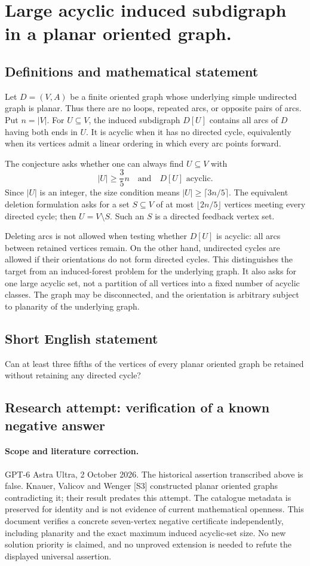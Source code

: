 \documentclass[11pt,a4paper]{article}
\begin{document}
\section*{Large acyclic induced subdigraph in a planar oriented graph.}\label{statement}

\subsection{Definitions and mathematical statement}
Let $D=(V,A)$ be a finite oriented graph whose underlying simple
undirected graph is planar. Thus there are no loops, repeated arcs,
or opposite pairs of arcs. Put $n=|V|$. For $U\subseteq V$, the induced
subdigraph $D[U]$ contains all arcs of $D$ having both ends in $U$.
It is acyclic when it has no directed cycle, equivalently when its
vertices admit a linear ordering in which every arc points forward.

The conjecture asks whether one can always find $U\subseteq V$ with
\[
                           |U|\ge\frac35n
                  \quad\text{and}\quad D[U]\text{ acyclic}.
\]
Since $|U|$ is an integer, the size condition means
$|U|\ge\lceil3n/5\rceil$. The equivalent deletion formulation asks for
a set $S\subseteq V$ of at most $\lfloor2n/5\rfloor$ vertices meeting
every directed cycle; then $U=V\setminus S$. Such an $S$ is a directed
feedback vertex set.

Deleting arcs is not allowed when testing whether $D[U]$ is acyclic:
all arcs between retained vertices remain. On the other hand,
undirected cycles are allowed if their orientations do not form
directed cycles. This distinguishes the target from an induced-forest
problem for the underlying graph. It also asks for one large acyclic
set, not a partition of all vertices into a fixed number of acyclic
classes. The graph may be disconnected, and the orientation is arbitrary
subject to planarity of the underlying graph.
\subsection{Short English statement}
Can at least three fifths of the vertices of every planar oriented graph be retained without retaining any directed cycle?
\subsection{Research attempt: verification of a known negative answer}
\paragraph{Scope and literature correction.}
GPT-6 Astra Ultra, 2 October 2026. The historical assertion transcribed
above is false. Knauer, Valicov and Wenger [S3] constructed planar
oriented graphs contradicting it; their result predates this attempt.
The catalogue metadata is preserved for identity and is not evidence
of current mathematical openness. This document verifies a concrete
seven-vertex negative certificate independently, including planarity
and the exact maximum induced acyclic-set size. No new solution
priority is claimed, and no unproved extension is needed to refute
the displayed universal assertion.
\end{document}
